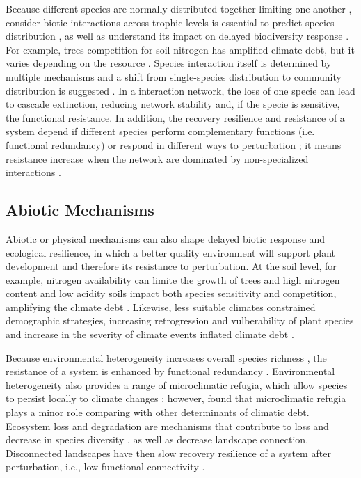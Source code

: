 Because different species are normally distributed together limiting one another \citep{clark2014}, consider biotic interactions across trophic levels is essential to predict species distribution \citep{VanderPutten2010}, as well as understand its impact on delayed biodiversity response \citep{Essl2015}.
For example, trees competition for soil nitrogen has amplified climate debt, but it varies depending on the resource \citep{Bertrand2016}.
Species interaction itself is determined by multiple mechanisms \citep[for an overview]{Louthan2015} and a shift from single-species distribution to community distribution is suggested \citep{Cazelles2016}.
In a interaction network, the loss of one specie can lead to cascade extinction, reducing network stability \citep{Dunne2002} and, if the specie is sensitive, the functional resistance.
In addition, the recovery resilience and resistance of a system depend if different species perform complementary functions (i.e. functional redundancy) or respond in different ways to perturbation \citep{Winfree2009}; it means resistance increase when the network are dominated by non-specialized interactions \citep{Oliver2015}.

\subsection{Abiotic Mechanisms}

Abiotic or physical mechanisms can also shape delayed biotic response and ecological resilience, in which a better quality environment will support plant development and therefore its resistance to perturbation.
At the soil level, for example, nitrogen availability can limite the growth of trees \citep{Sullivan2013} and high nitrogen content and low acidity soils impact both species sensitivity and competition, amplifying the climate debt \citep{Bertrand2016}.
Likewise, less suitable climates constrained demographic strategies, increasing retrogression and vulberability of plant species \citep{Csergo2017}  and increase in the severity of climate events inflated climate debt \citep{Bertrand2016}.

Because environmental heterogeneity increases overall species richness \citep{Stein2014}, the resistance of a system is enhanced by functional redundancy \citep{Oliver2015}.
Environmental heterogeneity also provides a range of microclimatic refugia, which allow species to persist locally to climate changes \citep{Maclean2015}; however, \citet{Bertrand2016} found that microclimatic refugia plays a minor role comparing with other determinants of climatic debt.
Ecosystem loss and degradation are mechanisms that contribute to loss and decrease in species diversity \citep{Essl2015}, as well as decrease landscape connection.
Disconnected landscapes have then slow recovery resilience of a system after perturbation, i.e., low functional connectivity \citep{Oliver2015}.

